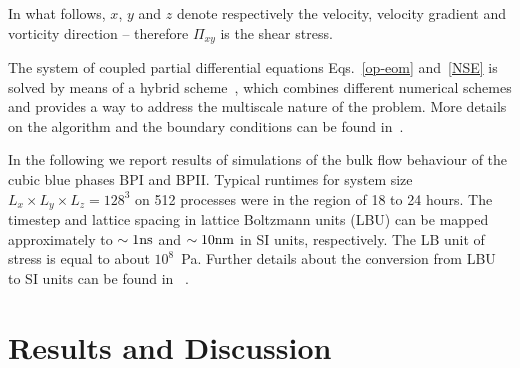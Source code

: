 \documentclass[8.5pt,twoside,twocolumn]{article}
\begin{document}
\fi

In what follows, $x$, $y$ and $z$ denote respectively the velocity, velocity
gradient and vorticity direction -- therefore $\Pi_{xy}$ is the shear stress.

The system of coupled partial differential equations Eqs.~\ref{op-eom}
and~\ref{NSE} is solved by means of a
hybrid scheme~\cite{Marenduzzo:2007}, which combines different numerical schemes
and provides a way to address the multiscale nature of the problem.
More details on the algorithm and the boundary conditions can
be found in~\cite{Denniston:2001, Denniston:2004, Henrich:2012a}.

In the following we report results of simulations of the bulk flow behaviour of the cubic blue 
phases BPI and BPII.
Typical runtimes for system size $L_x\times L_y\times L_z=128^3$ on 512 processes were in the region of 18 to 24 hours.  
The timestep and lattice spacing in lattice Boltzmann units (LBU) can be mapped
approximately to $\sim 1 {\rm ns}$ and $\sim 10{\rm nm}$ in SI units, respectively. The LB unit of stress
is equal to about $10^8$~Pa. Further details about the conversion 
from LBU to SI units can be found in ~\cite{Henrich:2011a,Henrich:2010b}.

\section{Results and Discussion}
\end{document}
